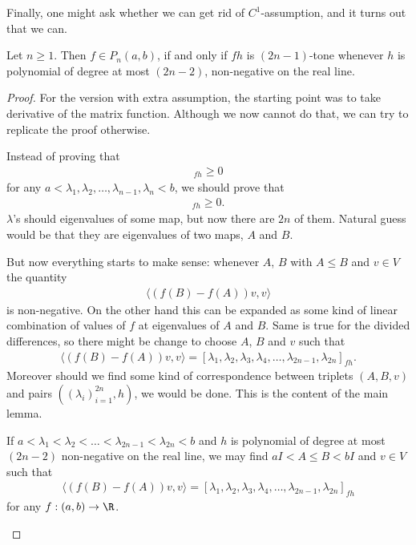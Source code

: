 Finally, one might ask whether we can get rid of $C^{1}$-assumption, and it turns out that we can.

\begin{lause}
	Let $n \geq 1$. Then $f \in P_{n}(a, b)$, if and only if $f h$ is $(2 n - 1)$-tone whenever $h$ is polynomial of degree at most $(2 n - 2)$, non-negative on the real line. 
\end{lause}
\begin{proof}
	For the version with extra assumption, the starting point was to take derivative of the matrix function. Although we now cannot do that, we can try to replicate the proof otherwise.

	Instead of proving that
	\begin{align*}
		[\lambda_{1}, \lambda_{1}, \lambda_{2}, \lambda_{2}, \ldots, \lambda_{n}, \lambda_{n}]_{f h} \geq 0
	\end{align*}
	for any $a < \lambda_{1}, \lambda_{2}, \ldots, \lambda_{n - 1}, \lambda_{n} < b$, we should prove that
	\begin{align*}
		[\lambda_{1}, \lambda_{2}, \lambda_{3}, \lambda_{4}, \ldots, \lambda_{2n - 1}, \lambda_{2 n}]_{f h} \geq 0.
	\end{align*}
	$\lambda$'s should eigenvalues of some map, but now there are $2 n$ of them. Natural guess would be that they are eigenvalues of two maps, $A$ and $B$.

	But now everything starts to make sense: whenever $A$, $B$ with $A \leq B$ and $v \in V$ the quantity
	\begin{align*}
		\langle (f(B) - f(A)) v, v \rangle
	\end{align*}
	is non-negative. On the other hand this can be expanded as some kind of linear combination of values of $f$ at eigenvalues of $A$ and $B$. Same is true for the divided differences, so there might be change to choose $A$, $B$ and $v$ such that
	\begin{align*}
		\langle (f(B) - f(A)) v, v \rangle = [\lambda_{1}, \lambda_{2}, \lambda_{3}, \lambda_{4}, \ldots, \lambda_{2n - 1}, \lambda_{2 n}]_{f h}.
	\end{align*}
	Moreover should we find some kind of correspondence between triplets $(A, B, v)$ and pairs $((\lambda_{i})_{i = 1}^{2 n}, h)$, we would be done. This is the content of the main lemma.

	\begin{lem}\label{main_lemma}
		If $a < \lambda_{1} < \lambda_{2} < \ldots < \lambda_{2 n - 1} < \lambda_{2 n} < b$ and $h$ is polynomial of degree at most $(2 n - 2)$ non-negative on the real line, we may find $a I < A \leq  B < b I$ and $v \in V$ such that
		\begin{align*}
			\langle (f(B) - f(A)) v, v \rangle = [\lambda_{1}, \lambda_{2}, \lambda_{3}, \lambda_{4}, \ldots, \lambda_{2n - 1}, \lambda_{2 n}]_{f h}
		\end{align*}
		for any $f : (a, b) \to \R$.


\end{lem}
\end{proof}

